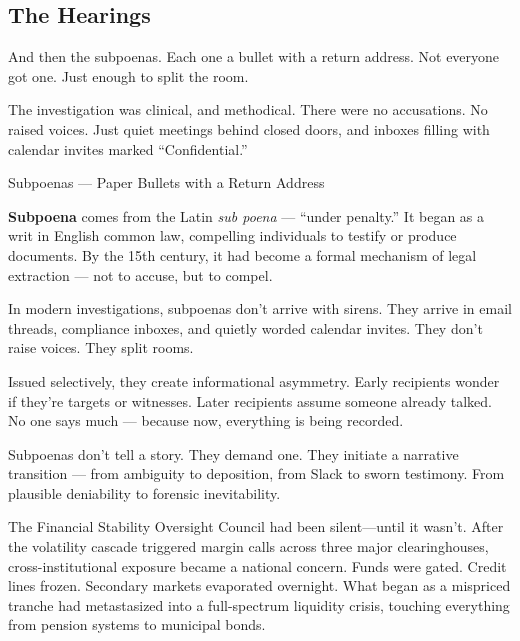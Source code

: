 \subsection{The Hearings}


And then the subpoenas.  
Each one a bullet with a return address.  
Not everyone got one. Just enough to split the room.


The investigation was clinical, and methodical.  
There were no accusations. No raised voices.  
Just quiet meetings behind closed doors,  
and inboxes filling with calendar invites marked “Confidential.”

\medskip

\begin{HistoricalSidebar}{Subpoenas --- Paper Bullets with a Return Address}

  \textbf{Subpoena} comes from the Latin \textit{sub poena} — ``under penalty.'' It began as a writ in English 
  common law, compelling individuals to testify or produce documents. By the 15th century, it had become a 
  formal mechanism of legal extraction — not to accuse, but to compel.

  \medskip

  In modern investigations, subpoenas don’t arrive with sirens. They arrive in email threads, compliance inboxes, 
  and quietly worded calendar invites. They don’t raise voices. They split rooms.

  \medskip

  Issued selectively, they create informational asymmetry. Early recipients wonder if they’re targets or witnesses. 
  Later recipients assume someone already talked. No one says much — because now, everything is being recorded.

  \medskip

  Subpoenas don’t tell a story. They demand one. They initiate a narrative transition — from ambiguity to deposition, 
  from Slack to sworn testimony. From plausible deniability to forensic inevitability.
  
\end{HistoricalSidebar}

\medskip

The Financial Stability Oversight Council had been silent—until it wasn’t.
After the volatility cascade triggered margin calls across three major clearinghouses, cross-institutional exposure became a national concern.
Funds were gated. Credit lines frozen. Secondary markets evaporated overnight.
What began as a mispriced tranche had metastasized into a full-spectrum liquidity crisis, touching everything from pension systems to municipal bonds.

